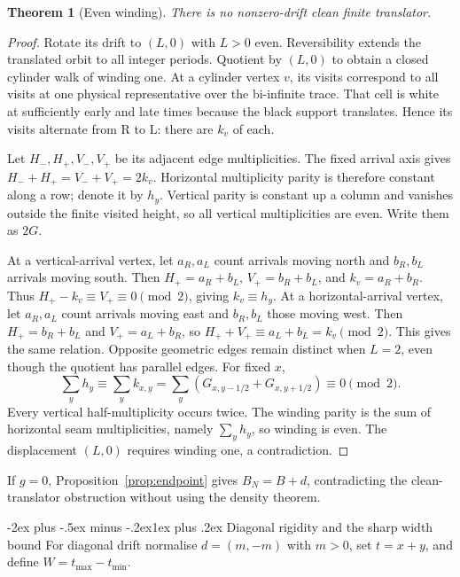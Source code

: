 \documentclass[11pt,letterpaper]{article}
\makeatletter
\renewcommand\section{\@startsection{section}{1}{\z@}%
  {-2ex plus -.5ex minus -.2ex}{1ex plus .2ex}%
  {\normalfont\Large\bfseries}}
\newtheorem{theorem}{Theorem}[section]
\makeatother
\begin{document}
\begin{theorem}[Even winding]\label{thm:winding}
There is no nonzero-drift clean finite translator.
\end{theorem}
\begin{proof}
Rotate its drift to $(L,0)$ with $L>0$ even. Reversibility extends the
translated orbit to all integer periods. Quotient by $(L,0)$ to obtain
a closed cylinder walk of winding one. At a cylinder vertex $v$, its
visits correspond to all visits at one physical representative over the
bi-infinite trace. That cell is white at sufficiently early and late
times because the black support translates. Hence its visits alternate
from R to L: there are $k_v$ of each.

Let $H_-,H_+,V_-,V_+$ be its adjacent edge multiplicities. The fixed
arrival axis gives
$H_-+H_+=V_-+V_+=2k_v$.
Horizontal multiplicity parity is therefore constant along a row; denote
it by $h_y$. Vertical parity is constant up a column and vanishes outside
the finite visited height, so all vertical multiplicities are even.
Write them as $2G$.

At a vertical-arrival vertex, let $a_R,a_L$ count arrivals moving north
and $b_R,b_L$ arrivals moving south. Then
$H_+=a_R+b_L$, $V_+=b_R+b_L$, and $k_v=a_R+b_R$.
Thus $H_+-k_v\equiv V_+\equiv0\pmod2$, giving $k_v\equiv h_y$.
At a horizontal-arrival vertex, let $a_R,a_L$ count arrivals moving
east and $b_R,b_L$ those moving west. Then $H_+=b_R+b_L$ and
$V_+=a_L+b_R$, so $H_++V_+\equiv a_L+b_L=k_v\pmod2$.
This gives the same relation. Opposite geometric edges remain distinct
when $L=2$, even though the quotient has parallel edges. For fixed $x$,
\[
\sum_y h_y\equiv\sum_y k_{x,y}
=\sum_y(G_{x,y-1/2}+G_{x,y+1/2})\equiv0\pmod2.
\]
Every vertical half-multiplicity occurs twice. The winding parity is the
sum of horizontal seam multiplicities, namely $\sum_yh_y$, so winding
is even. The displacement $(L,0)$ requires winding one, a contradiction.
\end{proof}
If $g=0$, Proposition~\ref{prop:endpoint} gives $B_N=B+d$, contradicting
the clean-translator obstruction without using the density theorem.

\section{Diagonal rigidity and the sharp width bound}
For diagonal drift normalise $d=(m,-m)$ with $m>0$, set
$t=x+y$, and define $W=t_{\max}-t_{\min}$.
\end{document}
